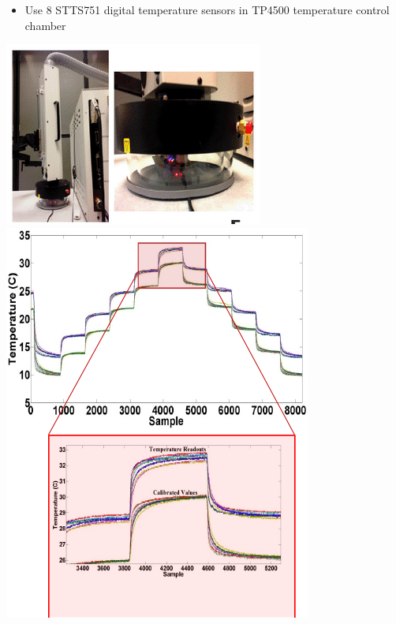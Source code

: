\documentclass[landscape,final,a0paper,fontscale=0.285]{baposter}
\newcommand{\compresslist}{%
\setlength{\itemsep}{1pt}%
\setlength{\parskip}{0pt}%
\setlength{\parsep}{0pt}%
}
\begin{document}
\begin{poster}
{\begin{multicols}{2}
\begin{itemize} \compresslist
\item Use 8 STTS751 digital temperature sensors in TP4500 temperature control chamber
\end{itemize}
\begin{center}
\includegraphics[width=0.8\columnwidth]{tp4500}
\includegraphics[width=0.8\columnwidth]{temp_calib}
\end{center}

\end{multicols}

}


\end{poster}
\end{document}

